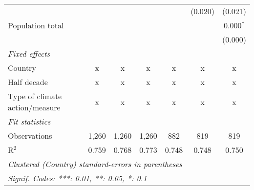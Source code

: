 \begin{tabular}{lcccccc}
                                                                                       &               &               &                &                & (0.020)        & (0.021)\\   
   Population total                                                                    &               &               &                &                &                & 0.000$^{*}$\\   
                                                                                       &               &               &                &                &                & (0.000)\\   
   \emph{Fixed effects}\\
   Country                                                                             & x             & x             & x              & x              & x              & x\\  
   Half decade                                                                         & x             & x             & x              & x              & x              & x\\  
   Type of climate action/measure                                                      & x             & x             & x              & x              & x              & x\\  
   \midrule \emph{Fit statistics}\\
   Observations                                                                        & 1,260         & 1,260         & 1,260          & 882            & 819            & 819\\  
   R$^2$                                                                               & 0.759         & 0.768         & 0.773          & 0.748          & 0.748          & 0.750\\  
   \midrule
   \multicolumn{7}{l}{\emph{Clustered (Country) standard-errors in parentheses}}\\
   \multicolumn{7}{l}{\emph{Signif. Codes: ***: 0.01, **: 0.05, *: 0.1}}\\
\end{tabular}
\par\endgroup



